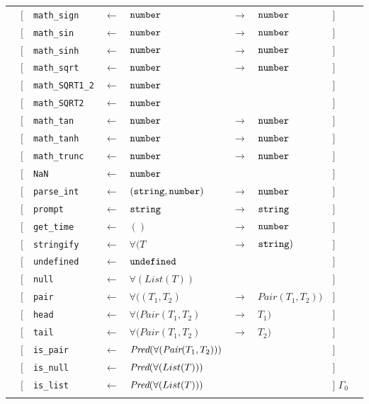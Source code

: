 \begin{tabular}[fragile]{lllllllll}
& $[$ & \texttt{math\_sign} & $\leftarrow$  & $\texttt{number}$ & $\rightarrow$ & $\texttt{number}$ & $]$ \\
& $[$ & \texttt{math\_sin} & $\leftarrow$  & $\texttt{number}$ & $\rightarrow$ & $\texttt{number}$ & $]$ \\
& $[$ & \texttt{math\_sinh} & $\leftarrow$  & $\texttt{number}$ & $\rightarrow$ & $\texttt{number}$ & $]$ \\
& $[$ & \texttt{math\_sqrt} & $\leftarrow$  & $\texttt{number}$ & $\rightarrow$ & $\texttt{number}$ & $]$ \\
& $[$ & \texttt{math\_SQRT1\_2} & $\leftarrow$  & $\texttt{number}$ & & & $]$ \\
& $[$ & \texttt{math\_SQRT2} & $\leftarrow$  & $\texttt{number}$ & & & $]$ \\
& $[$ & \texttt{math\_tan} & $\leftarrow$  & $\texttt{number}$ & $\rightarrow$ & $\texttt{number}$ & $]$ \\
& $[$ & \texttt{math\_tanh} & $\leftarrow$  & $\texttt{number}$ & $\rightarrow$ & $\texttt{number}$ & $]$ \\
& $[$ & \texttt{math\_trunc} & $\leftarrow$  & $\texttt{number}$ & $\rightarrow$ & $\texttt{number}$ & $]$ \\
& $[$ & \texttt{NaN} & $\leftarrow$  & $\texttt{number}$ & & & $]$ \\
& $[$ & \texttt{parse\_int} & $\leftarrow$  & $(\texttt{string}, \texttt{number})$ & $\rightarrow$ & $\texttt{number}$ & $]$ \\
& $[$ & \texttt{prompt} & $\leftarrow$  & $\texttt{string}$ & $\rightarrow$ & $\texttt{string}$ & $]$ \\
& $[$ & \texttt{get\_time} & $\leftarrow$  & $()$ & $\rightarrow$ & $\texttt{number}$ & $]$ \\
& $[$ & \texttt{stringify} & $\leftarrow$  & $\forall(T$ & $\rightarrow$ & $\texttt{string})$ & $]$ \\
& $[$ & \texttt{undefined} & $\leftarrow$  & $\texttt{undefined}$ & & & $]$ & \\
& $[$ & \texttt{null}      & $\leftarrow$  & $\forall(List(T))$ & & & $]$ \\
& $[$ & \texttt{pair} & $\leftarrow$  & $\forall((T_1,T_2)$ & $\rightarrow$ & $Pair(T_1,T_2))$ & $]$ \\
& $[$ & \texttt{head} & $\leftarrow$  & $\forall(Pair(T_1,T_2)$ & $\rightarrow$ & $T_1)$ & $]$ \\
& $[$ & \texttt{tail} & $\leftarrow$  & $\forall(Pair(T_1,T_2)$ & $\rightarrow$ & $T_2)$ & $]$ \\
& $[$ & \texttt{is\_pair} & $\leftarrow$  & $\textit{Pred}(\forall(\textit{Pair}(T_1, T_2)))$ & & & $]$ \\
& $[$ & \texttt{is\_null} & $\leftarrow$  & $\textit{Pred}(\forall(List(T)))$ & & & $]$ \\
& $[$ & \texttt{is\_list} & $\leftarrow$  & $\textit{Pred}(\forall(List(T)))$ & & & $]$ $\Gamma_0$ \\
& \end{tabular}
 
